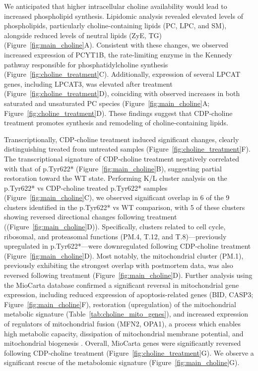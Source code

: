 We anticipated that higher intracellular choline availability would lead to increased phospholipid synthesis. Lipidomic analysis revealed elevated levels of phospholipids, particularly choline-containing lipids (PC, LPC, and SM), alongside reduced levels of neutral lipids (ZyE, TG) (Figure~\ref{fig:main_choline}A). Consistent with these changes, we observed increased expression of PCYT1B, the rate-limiting enzyme in the Kennedy pathway responsible for phosphatidylcholine synthesis (Figure~\ref{fig:choline_treatment}C). Additionally, expression of several LPCAT genes, including LPCAT3, was elevated after treatment (Figure~\ref{fig:choline_treatment}D), coinciding with observed increases in both saturated and unsaturated PC species (Figure~\ref{fig:main_choline}A; Figure~\ref{fig:choline_treatment}D). These findings suggest that CDP-choline treatment promotes synthesis and remodeling of choline-containing lipids.

Transcriptionally, CDP-choline treatment induced significant changes, clearly distinguishing treated from untreated samples (Figure~\ref{fig:choline_treatment}F). The transcriptional signature of CDP-choline treatment negatively correlated with that of p.Tyr622* (Figure~\ref{fig:main_choline}B), suggesting partial restoration toward the WT state. Performing K/L cluster analysis on the p.Tyr622* vs CDP-choline treated p.Tyr622* samples (Figure~\ref{fig:main_choline}C), we observed significant overlap in 6 of the 9 clusters identified in the p.Tyr622* vs WT comparison, with 5 of these clusters showing reversed directional changes following treatment ((Figure~\ref{fig:main_choline}D)). Specifically, clusters related to cell cycle, ribosomal, and proteasomal functions (PM.4, T.12, and T.8)—previously upregulated in p.Tyr622*—were downregulated following CDP-choline treatment (Figure~\ref{fig:main_choline}D). Most notably, the mitochondrial cluster (PM.1), previously exhibiting the strongest overlap with postmortem data, was also reversed following treatment (Figure~\ref{fig:main_choline}D). Further analysis using the MioCarta database confirmed a significant reversal in mitochondrial gene expression, including reduced expression of apoptosis-related genes (BID, CASP3; Figure~\ref{fig:main_choline}F), restoration (upregulation) of the mitochondrial metabolic signature (Table~\ref{tab:choline_mito_genes}), and increased expression of regulators of mitochondrial fusion (MFN2, OPA1), a process which enables high metabolic capacity, dissipation of mitochondrial membrane potential, and mitochondrial biogenesis . Overall, MioCarta genes were significantly reversed following CDP-choline treatment (Figure~\ref{fig:choline_treatment}G). We observe a significant rescue of the metabolomic signature (Figure~\ref{fig:main_choline}G).

